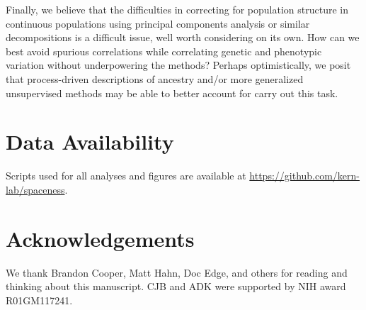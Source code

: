 \documentclass[10pt,twoside,lineno,hidelinks]{preprint}
\begin{document}

Finally, we believe that the difficulties in correcting for population structure in continuous populations 
using principal components analysis or similar decompositions is a difficult issue, well worth considering on its own.
How can we best avoid spurious correlations while correlating genetic and phenotypic variation 
without underpowering the methods?
Perhaps optimistically,
we posit that process-driven descriptions of ancestry 
and/or more generalized unsupervised methods may be able to better account for carry out this task.


\section{Data Availability}
Scripts used for all analyses and figures are available at \url{https://github.com/kern-lab/spaceness}. 

\section{Acknowledgements}
We thank Brandon Cooper, Matt Hahn, Doc Edge, and others for reading and thinking about this manuscript. 
CJB and ADK were supported by NIH award R01GM117241. 





\appendix
\setcounter{table}{0}
\renewcommand{\thetable}{A\arabic{table}}%
\setcounter{figure}{0}
\renewcommand{\thefigure}{A\arabic{figure}}%
\end{document}
